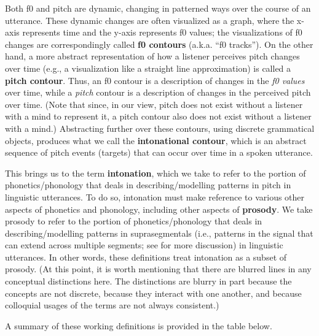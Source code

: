 \documentclass[11pt, twoside]{memoir}
\begin{document}
Both f0 and pitch are dynamic, changing in patterned ways over the course of an utterance. These dynamic changes are often visualized as a graph, where the x-axis represents time and the y-axis represents f0 values; the visualizations of f0 changes are correspondingly called \textbf{f0 contours} (a.k.a. “f0 tracks”). On the other hand, a more abstract representation of how a listener perceives pitch changes over time (e.g., a visualization like a straight line approximation) is called a \textbf{pitch contour}. Thus, an f0 contour is a description of changes in the \emph{f0 values} over time, while a \emph{pitch} contour is a description of changes in the perceived pitch over time. (Note that since, in our view, pitch does not exist without a listener with a mind to represent it, a pitch contour also does not exist without a listener with a mind.) Abstracting further over these contours, using discrete grammatical objects, produces what we call the \textbf{intonational contour}, which is an abstract sequence of pitch events (targets) that can occur over time in a spoken utterance.

This brings us to the term \textbf{intonation}, which we take to refer to the portion of phonetics\slash phonology that deals in describing\slash modelling patterns in pitch in linguistic utterances. To do so, intonation must make reference to various other aspects of phonetics and phonology, including other aspects of \textbf{prosody}. We take prosody to refer to the portion of phonetics\slash phonology that deals in describing\slash modelling patterns in suprasegmentals (i.e., patterns in the signal that can extend across multiple segments; see \citealt{lehiste70} for more discussion) in linguistic utterances. In other words, these definitions treat intonation as a subset of prosody. (At this point, it is worth mentioning that there are blurred lines in any conceptual distinctions here. The distinctions are blurry in part because the concepts are not discrete, because they interact with one another, and because colloquial usages of the terms are not always consistent.)

A summary of these working definitions is provided in the table below.
\end{document}
